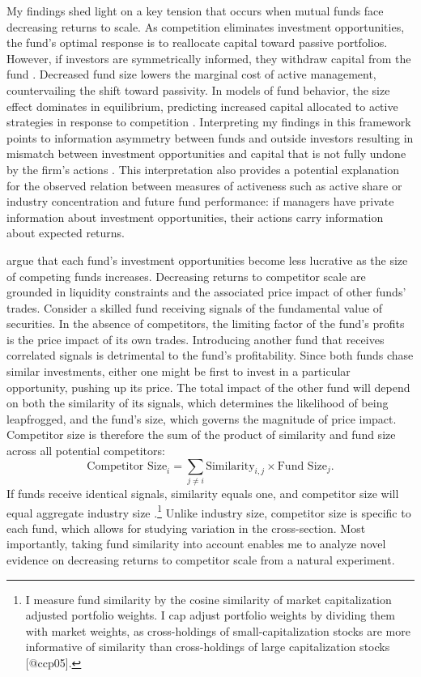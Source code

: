 \documentclass[openany]{book}
\let\rmarkdownfootnote\footnote%
\def\footnote{\protect\rmarkdownfootnote}
\theoremstyle{definition}
\theoremstyle{definition}
\theoremstyle{definition}
\theoremstyle{remark}
\begin{document}
My findings shed light on a key tension that occurs when mutual funds
face decreasing returns to scale. As competition eliminates investment
opportunities, the fund's optimal response is to reallocate capital
toward passive portfolios. However, if investors are symmetrically
informed, they withdraw capital from the fund \citep{bg04}. Decreased
fund size lowers the marginal cost of active management, countervailing
the shift toward passivity. In models of fund behavior, the size effect
dominates in equilibrium, predicting increased capital allocated to
active strategies in response to competition \citep{pst17L}.
Interpreting my findings in this framework points to information
asymmetry between funds and outside investors resulting in mismatch
between investment opportunities and capital that is not fully undone by
the firm's actions \citep{bbl17}. This interpretation also provides a
potential explanation for the observed relation between measures of
activeness such as active share \citep{cp09} or industry concentration
\citep{ksz05} and future fund performance: if managers have private
information about investment opportunities, their actions carry
information about expected returns.

\citet{ps12} argue that each fund's investment opportunities become less
lucrative as the size of competing funds increases. Decreasing returns
to competitor scale are grounded in liquidity constraints and the
associated price impact of other funds' trades. Consider a skilled fund
receiving signals of the fundamental value of securities. In the absence
of competitors, the limiting factor of the fund's profits is the price
impact of its own trades. Introducing another fund that receives
correlated signals is detrimental to the fund's profitability. Since
both funds chase similar investments, either one might be first to
invest in a particular opportunity, pushing up its price. The total
impact of the other fund will depend on both the similarity of its
signals, which determines the likelihood of being leapfrogged, and the
fund's size, which governs the magnitude of price impact. Competitor
size is therefore the sum of the product of similarity and fund size
across all potential competitors: \[
\text{Competitor Size}_i = \sum_{j\neq i} \text{Similarity}_{i,j} \times \text{Fund Size}_j.
\] If funds receive identical signals, similarity equals one, and
competitor size will equal aggregate industry size
\citep{pst15}.\footnote{
I measure fund similarity by the cosine similarity of market capitalization adjusted portfolio weights. I cap adjust portfolio weights by dividing them with market weights, as cross-holdings of small-capitalization stocks are more informative of similarity than cross-holdings of large capitalization stocks [@ccp05].
} Unlike industry size, competitor size is specific to each fund, which
allows for studying variation in the cross-section. Most importantly,
taking fund similarity into account enables me to analyze novel evidence
on decreasing returns to competitor scale from a natural experiment.
\end{document}
